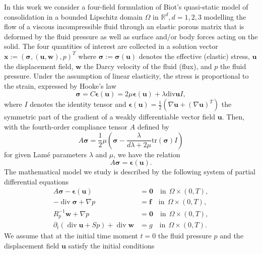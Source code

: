 \documentclass[11pt]{amsart}
\theoremstyle{remark}
\theoremstyle{definition}
\def\sig{{\bm \sigma}}
\def\bu{{\boldsymbol u}}
\def\bw{{\boldsymbol w}}
\def\bff{{\boldsymbol f}}
\renewcommand{\div}{\operatorname{div}}
\renewcommand{\div}{\operatorname{div}}
\def\eps{\boldsymbol \epsilon}
\def\sig{\boldsymbol \sigma}
\def\bu{\boldsymbol u}
\def\bw{\boldsymbol w}
\def\bx{\boldsymbol x}
\def\divv{\text{div}}
\begin{document}
In this work we consider a four-field formulation of Biot's quasi-static model of consolidation in a bounded Lipschitz domain
$\Omega$ in $\mathbb{R}^{d}, d=1,2,3$ modelling the flow of a viscous incompressible fluid through an elastic porous matrix 
that is deformed by the fluid pressure as well as surface and/or body forces acting on the solid. The four quantities of interest are collected in a solution vector $\bx := (\sig,(\bu,\bw),p)^T$ where $\sig:=\sig(\bu)$ denotes the effective (elastic) stress, $\bu$ the displacement field, $\bw$ the Darcy velocity of the fluid (flux), and $p$ the fluid pressure. Under the assumption of linear elasticity, the stress is proportional to the strain, expressed by Hooke's law
%
\begin{equation}\label{eq:Hook}
\sig = C \eps(\bu) = 2 \mu \eps(\bu) + \lambda \divv \bu I ,
\end{equation}
%
where $I$ denotes the identity tensor and $\eps(\bu) = \frac{1}{2}(\nabla \bu + (\nabla \bu)^T)$ the symmetric part of the gradient of
a weakly differentiable vector field $\bu$. Then, with the fourth-order compliance tensor $A$ defined by
$$
A \sig = \frac{1}{2} \mu \left(
\sig - \frac{\lambda}{d \lambda+2 \mu}
\text{tr}(\sig) I  \right)
$$
for given Lam\'{e} parameters $\lambda$ and $\mu$, we have the relation
%
\begin{equation}\label{eq:Hook_2}
A \sig = \eps(\bu).
\end{equation}
%
The mathematical model we study is described by the following system of partial differential equations
%
\begin{subequations}\label{eq:Biot_strong}
\begin{align}
A \sig - \eps(\bu) &= {\bm 0} \quad \text{in}~~ \Omega\times (0,T),
\label{Biot1_strong}\\
-\div \sig  +  \nabla p 
&= \bff \quad \text{in}~~ \Omega\times (0,T),
\label{Biot2_strong}\\
%
R_p^{-1}  \bw + \nabla p&= \boldsymbol 0 \quad \text{in}~~ \Omega\times (0,T), \label{Biot3_strong}\\
%
\partial_t \left( \div \bu + S p\right) + \div \bw  &=g \quad \text{in}~~ \Omega\times (0,T).
\label{Biot4_strong}
\end{align}
\end{subequations}
%
We assume that at the initial time moment $t=0$ the fluid pressure $p$ and the displacement field $\bu$ satisfy the initial conditions
\end{document}
